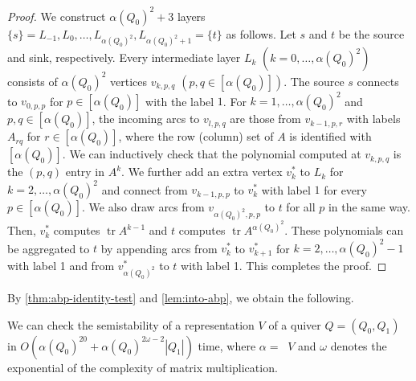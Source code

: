 \documentclass[a4paper,11pt]{article}
\numberwithin{equation}{section}
\DeclareMathOperator{\tr}{tr}
\DeclareMathOperator{\dimv}{\underline{dim}}
\begin{document}
\begin{proof}
    We construct ${\alpha(Q_0)}^2 + 3$ layers $\{s\} = L_{-1}, L_0, \dotsc, L_{{\alpha(Q_0)}^2}, L_{{\alpha(Q_0)}^2+1} = \{t\}$ as follows.
    Let $s$ and $t$ be the source and sink, respectively.
    Every intermediate layer $L_k$ $(k = 0, \dotsc, {\alpha(Q_0)}^2)$ consists of ${\alpha(Q_0)}^2$ vertices $v_{k,p,q}$ $(p,q \in [{\alpha(Q_0)}])$.
    The source $s$ connects to $v_{0,p,p}$ for $p \in [\alpha(Q_0)]$ with the label $1$. 
    For $k = 1, \dotsc, {\alpha(Q_0)}^2$ and $p, q \in [{\alpha(Q_0)}]$, the incoming arcs to $v_{l,p,q}$ are those from $v_{k-1,p,r}$ with labels $A_{rq}$ for $r \in [{\alpha(Q_0)}]$, where the row (column) set of $A$ is identified with $[\alpha(Q_0)]$.
    We can inductively check that the polynomial computed at $v_{k,p,q}$ is the $(p,q)$ entry in $A^k$.
    We further add an extra vertex $v^*_k$ to $L_k$ for $k = 2, \dotsc, {\alpha(Q_0)}^2$ and connect from $v_{k-1,p,p}$ to $v^*_k$ with label $1$ for every $p \in [\alpha(Q_0)]$.
    We also draw arcs from $v_{{\alpha(Q_0)}^2,p,p}$ to $t$ for all $p$ in the same way.
    Then, $v^*_k$ computes $\tr A^{k-1}$ and $t$ computes $\tr A^{{\alpha(Q_0)}^2}$.
    These polynomials can be aggregated to $t$ by appending arcs from $v^*_k$ to $v^*_{k+1}$ for $k = 2, \dotsc, {\alpha(Q_0)}^2 - 1$ with label 1 and from $v^*_{{\alpha(Q_0)}^2}$ to $t$ with label 1.
    This completes the proof.
\end{proof}

By \cref{thm:abp-identity-test} and \cref{lem:into-abp}, we obtain the following.

\begin{theorem}
    We can check the semistability of a representation $V$ of a quiver $Q = (Q_0, Q_1)$ in $O({\alpha(Q_0)}^{20} + {\alpha(Q_0)}^{2\omega - 2} |Q_1|)$ time, where $\alpha = \dimv V$ and $\omega$ denotes the exponential of the complexity of matrix multiplication.
\end{theorem}
\end{document}
